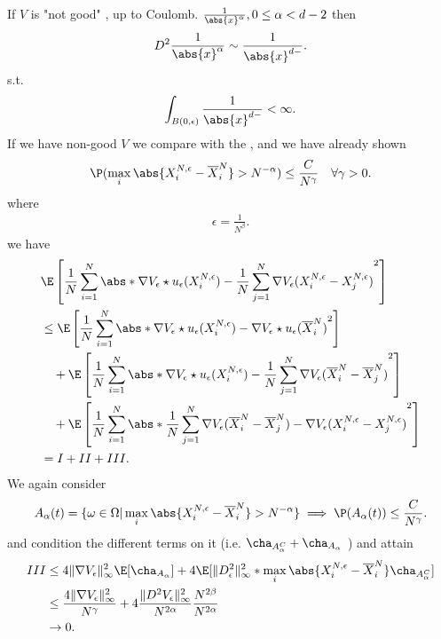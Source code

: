 \begin{corollary}
 If $V$ is "not good" , up to Coulomb.  $\frac{1}{\abs{x}^{\alpha } } , 0\le  \alpha  < d-2$ then 
 \begin{align*}
  D^2 \frac{1}{\abs{x}^{\alpha } } \sim \frac{1}{\abs{x}^{d-} }
 .\end{align*}
 s.t. 
 \begin{align*}
   \int_{B(0,\epsilon)} \frac{1}{\abs{x}^{d-} } < \infty
 .\end{align*}
 If we have non-good $V$ we compare with the , and we have already shown 
 \begin{align*}
   \P(\max_{i} \abs{X_i^{N,\epsilon} -\overline{X}_i^{N}  } > N^{-\alpha } ) \le \frac{C}{N^{\gamma } }  \quad \forall \gamma  >0
 .\end{align*}
 where 
 \begin{align*}
  \epsilon = \frac{1}{N^{\beta } }
 .\end{align*}
 we have 
 \begin{align*}
   &\E\left[\frac{1}{N} \sum_{i=1}^{N} \abs*{\nabla V_{\epsilon} \star  u_\epsilon(X_i^{N,\epsilon} ) - \frac{1}{N} \sum_{j=1}^{N} \nabla V_{\epsilon}(X_i^{N,\epsilon} - X_j^{N,\epsilon} )}^2  \right]\\
   &\le \E\left[\frac{1}{N} \sum_{i=1}^{N} \abs*{\nabla V_{\epsilon} \star  u_\epsilon(X_i^{N,\epsilon} ) - \nabla V_{\epsilon} \star  u_{\epsilon}(\overline{X}_i^{N}  )}^2  \right]\\ 
   & \quad +  \E\left[\frac{1}{N} \sum_{i=1}^{N} \abs*{\nabla V_{\epsilon} \star  u_\epsilon(X_i^{N,\epsilon} ) - \frac{1}{N} \sum_{j=1}^{N} \nabla V_{\epsilon}(\overline{X}_i^{N} - \overline{X}_j^{N} )}^2  \right]\\
   & \quad +  \E\left[\frac{1}{N} \sum_{i=1}^{N} \abs*{ \frac{1}{N} \sum_{j=1}^{N} \nabla V_{\epsilon}(\overline{X}_i^{N} - \overline{X}_j^{N} )- \nabla V_{\epsilon}(X_i^{N,\epsilon} - X_j^{N,\epsilon} )}^2  \right]\\
   &= I + II + III
 .\end{align*}
 We again consider  
 \begin{align*}
   A_{\alpha }(t) = \{\omega  \in  \Omega  | \max_{i} \abs{X_i^{N,\epsilon}  - \overline{X}_i^{N}  } > N^{-\alpha } \}   \implies \P(A_{\alpha }(t)) \le  \frac{C}{N^{\gamma } }
 .\end{align*}
 and condition the different terms on it (i.e. $\cha_{A_\alpha ^{C}} + \cha_{A_\alpha}  $ ) and attain 
 \begin{align*}
   III &\le  4 \|\nabla V_{\epsilon}\|_{\infty}^{2} \E[\cha_{A_\alpha}]  + 4\E[\|D^2_{\epsilon}\|_{\infty}^{2} * \max_{i}  \abs{X^{N,\epsilon}_i - \overline{X}^{N}_i   } \cha_{A_{\alpha }^{C} }] \\
       &\le  \frac{4 \|\nabla V_{\epsilon}\|_{\infty}^{2}}{N^{\gamma} } +  4 \frac{\|D^2 V_{\epsilon}\|_{\infty}^2}{N^{2 \alpha }  } \frac{N^{2\beta } }{N^{2\alpha } }\\
       &\to  0
 .\end{align*}
\end{corollary}
